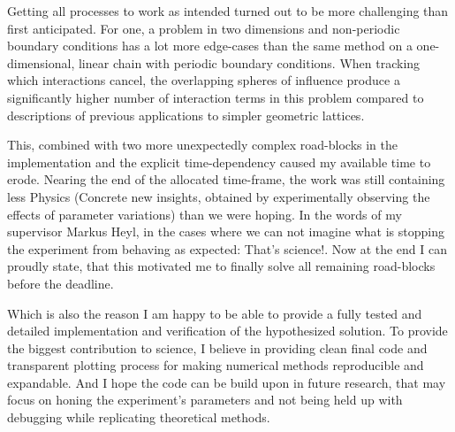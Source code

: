 Getting all processes to work as intended turned out to be more challenging than first anticipated.
For one, a problem in two dimensions and non-periodic boundary conditions has a lot more edge-cases than the same method on a one-dimensional, linear chain with periodic boundary conditions.
When tracking which interactions cancel, the overlapping \glqq spheres of influence\grqq{} produce a significantly higher number of interaction terms in this problem compared to descriptions of previous applications to simpler geometric lattices.

This, combined with two more unexpectedly complex road-blocks in the implementation and the explicit time-dependency caused my available time to erode.
Nearing the end of the allocated time-frame, the work was still containing less \glqq Physics\grqq{} (Concrete new insights, obtained by experimentally observing the effects of parameter variations) than we were hoping.
In the words of my supervisor Markus Heyl, in the cases where we can not imagine what is stopping the experiment from behaving as expected: \glqq That's science!\grqq{}.
Now at the end I can proudly state, that this motivated me to finally solve all remaining road-blocks before the deadline.

Which is also the reason I am happy to be able to provide a fully tested and detailed implementation and verification of the hypothesized solution.
To provide the biggest contribution to science, I believe in providing clean final code and transparent plotting process for making numerical methods reproducible and expandable.
And I hope the code can be build upon in future research, that may focus on honing the experiment's parameters and not being held up with debugging while replicating theoretical methods.

